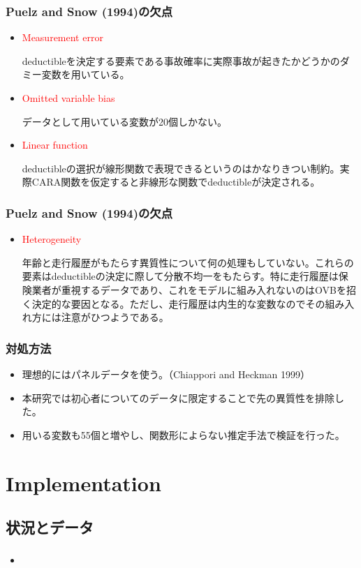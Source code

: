\documentclass[dvipdfmx, 12pt]{beamer}
\begin{document}
\begin{frame}\frametitle{Puelz and Snow (1994)の欠点}
	\begin{itemize}
	\item \textcolor{red}{Measurement error}
	
	deductibleを決定する要素である事故確率に実際事故が起きたかどうかのダミー変数を用いている。
	\item \textcolor{red}{Omitted variable bias}
	
	データとして用いている変数が20個しかない。
	\item \textcolor{red}{Linear function}
	
	deductibleの選択が線形関数で表現できるというのはかなりきつい制約。実際CARA関数を仮定すると非線形な関数でdeductibleが決定される。
	\end{itemize}
\end{frame}

\begin{frame}\frametitle{Puelz and Snow (1994)の欠点}
	\begin{itemize}
	\item \textcolor{red}{Heterogeneity}
	
	年齢と走行履歴がもたらす異質性について何の処理もしていない。これらの要素はdeductibleの決定に際して分散不均一をもたらす。特に走行履歴は保険業者が重視するデータであり、これをモデルに組み入れないのはOVBを招く決定的な要因となる。ただし、走行履歴は内生的な変数なのでその組み入れ方には注意がひつようである。
	\end{itemize}
\end{frame}

\begin{frame}\frametitle{対処方法}
	\begin{itemize}
	\item 理想的にはパネルデータを使う。（Chiappori and Heckman 1999）
	\item 本研究では初心者についてのデータに限定することで先の異質性を排除した。
	\item 用いる変数も55個と増やし、関数形によらない推定手法で検証を行った。
	\end{itemize}
\end{frame}


\section{Implementation}
\subsection{状況とデータ}
\begin{frame}\frametitle{}
	\begin{itemize}
	\item 
	\end{itemize}
\end{frame}
\end{document}
